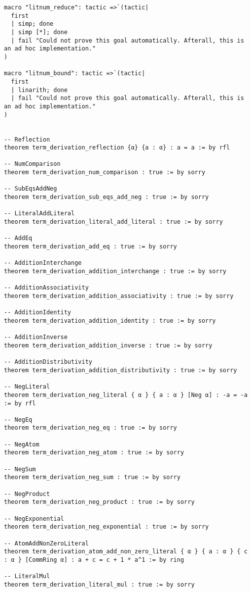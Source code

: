 \documentclass{article}
\begin{document}
\begin{tcolorbox}[colback=white!10, width=\linewidth]
\begin{lstlisting}[language=Lean4]
macro "litnum_reduce": tactic =>`(tactic|
  first
  | simp; done
  | simp [*]; done
  | fail "Could not prove this goal automatically. Afterall, this is an ad hoc implementation."
)

macro "litnum_bound": tactic =>`(tactic|
  first
  | linarith; done
  | fail "Could not prove this goal automatically. Afterall, this is an ad hoc implementation."
)


-- Reflection
theorem term_derivation_reflection {α} {a : α} : a = a := by rfl

-- NumComparison
theorem term_derivation_num_comparison : true := by sorry

-- SubEqsAddNeg
theorem term_derivation_sub_eqs_add_neg : true := by sorry

-- LiteralAddLiteral
theorem term_derivation_literal_add_literal : true := by sorry

-- AddEq
theorem term_derivation_add_eq : true := by sorry

-- AdditionInterchange
theorem term_derivation_addition_interchange : true := by sorry

-- AdditionAssociativity
theorem term_derivation_addition_associativity : true := by sorry

-- AdditionIdentity
theorem term_derivation_addition_identity : true := by sorry

-- AdditionInverse
theorem term_derivation_addition_inverse : true := by sorry

-- AdditionDistributivity
theorem term_derivation_addition_distributivity : true := by sorry

-- NegLiteral
theorem term_derivation_neg_literal { α } { a : α } [Neg α] : -a = -a := by rfl

-- NegEq
theorem term_derivation_neg_eq : true := by sorry

-- NegAtom
theorem term_derivation_neg_atom : true := by sorry

-- NegSum
theorem term_derivation_neg_sum : true := by sorry

-- NegProduct
theorem term_derivation_neg_product : true := by sorry

-- NegExponential
theorem term_derivation_neg_exponential : true := by sorry

-- AtomAddNonZeroLiteral
theorem term_derivation_atom_add_non_zero_literal { α } { a : α } { c : α } [CommRing α] : a + c = c + 1 * a^1 := by ring

-- LiteralMul
theorem term_derivation_literal_mul : true := by sorry


\end{lstlisting}
\end{tcolorbox}
\end{document}
